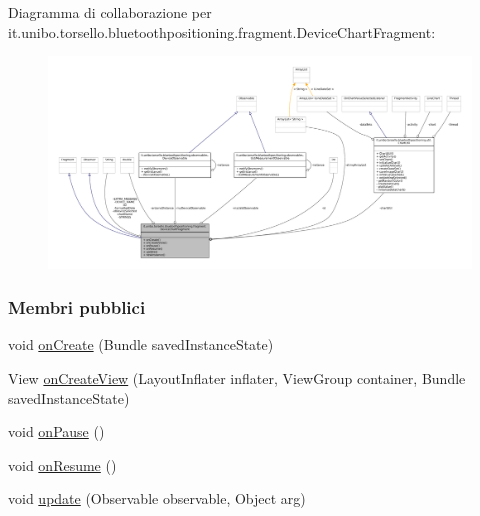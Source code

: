 Diagramma di collaborazione per it.\+unibo.\+torsello.\+bluetoothpositioning.\+fragment.\+Device\+Chart\+Fragment\+:
\nopagebreak
\begin{figure}[H]
\begin{center}
\leavevmode
\includegraphics[width=350pt]{classit_1_1unibo_1_1torsello_1_1bluetoothpositioning_1_1fragment_1_1DeviceChartFragment__coll__graph}
\end{center}
\end{figure}
\subsubsection*{Membri pubblici}
\begin{DoxyCompactItemize}
\item 
void \hyperlink{classit_1_1unibo_1_1torsello_1_1bluetoothpositioning_1_1fragment_1_1DeviceChartFragment_a08829e4742056e3f4ba3561c3de1e3d6_a08829e4742056e3f4ba3561c3de1e3d6}{on\+Create} (Bundle saved\+Instance\+State)
\item 
View \hyperlink{classit_1_1unibo_1_1torsello_1_1bluetoothpositioning_1_1fragment_1_1DeviceChartFragment_ae4d8a0e874dc5cd856de7424bc9269f0_ae4d8a0e874dc5cd856de7424bc9269f0}{on\+Create\+View} (Layout\+Inflater inflater, View\+Group container, Bundle saved\+Instance\+State)
\item 
void \hyperlink{classit_1_1unibo_1_1torsello_1_1bluetoothpositioning_1_1fragment_1_1DeviceChartFragment_a55f65f257b5facf73fb3ec7df689cbbb_a55f65f257b5facf73fb3ec7df689cbbb}{on\+Pause} ()
\item 
void \hyperlink{classit_1_1unibo_1_1torsello_1_1bluetoothpositioning_1_1fragment_1_1DeviceChartFragment_a039e605be958cf11403bc1358bfd70c0_a039e605be958cf11403bc1358bfd70c0}{on\+Resume} ()
\item 
void \hyperlink{classit_1_1unibo_1_1torsello_1_1bluetoothpositioning_1_1fragment_1_1DeviceChartFragment_a879725f924473013057be7f3aaea2ab0_a879725f924473013057be7f3aaea2ab0}{update} (Observable observable, Object arg)
\end{DoxyCompactItemize}
